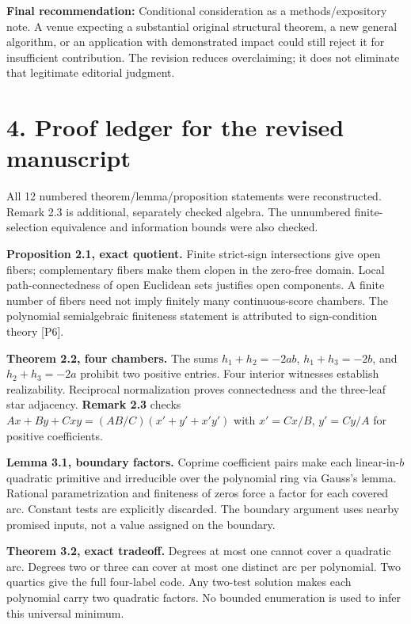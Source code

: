 \documentclass[
  11pt,
]{article}
\begin{document}
\textbf{Final recommendation:} Conditional consideration as a
methods/expository note. A venue expecting a substantial original
structural theorem, a new general algorithm, or an application with
demonstrated impact could still reject it for insufficient contribution.
The revision reduces overclaiming; it does not eliminate that legitimate
editorial judgment.

\section{4. Proof ledger for the revised
manuscript}\label{proof-ledger-for-the-revised-manuscript}

All 12 numbered theorem/lemma/proposition statements were reconstructed.
Remark 2.3 is additional, separately checked algebra. The unnumbered
finite-selection equivalence and information bounds were also checked.

\textbf{Proposition 2.1, exact quotient.} Finite strict-sign
intersections give open fibers; complementary fibers make them clopen in
the zero-free domain. Local path-connectedness of open Euclidean sets
justifies open components. A finite number of fibers need not imply
finitely many continuous-score chambers. The polynomial semialgebraic
finiteness statement is attributed to sign-condition theory {[}P6{]}.

\textbf{Theorem 2.2, four chambers.} The sums \(h_1+h_2=-2ab\),
\(h_1+h_3=-2b\), and \(h_2+h_3=-2a\) prohibit two positive entries. Four
interior witnesses establish realizability. Reciprocal normalization
proves connectedness and the three-leaf star adjacency. \textbf{Remark
2.3} checks \(Ax+By+Cxy=(AB/C)(x'+y'+x'y')\) with \(x'=Cx/B\),
\(y'=Cy/A\) for positive coefficients.

\textbf{Lemma 3.1, boundary factors.} Coprime coefficient pairs make
each linear-in-\(b\) quadratic primitive and irreducible over the
polynomial ring via Gauss's lemma. Rational parametrization and
finiteness of zeros force a factor for each covered arc. Constant tests
are explicitly discarded. The boundary argument uses nearby promised
inputs, not a value assigned on the boundary.

\textbf{Theorem 3.2, exact tradeoff.} Degrees at most one cannot cover a
quadratic arc. Degrees two or three can cover at most one distinct arc
per polynomial. Two quartics give the full four-label code. Any two-test
solution makes each polynomial carry two quadratic factors. No bounded
enumeration is used to infer this universal minimum.
\end{document}
